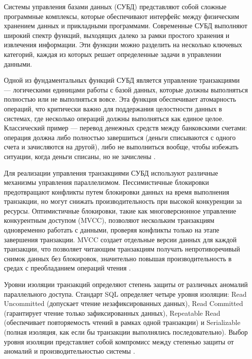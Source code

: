 \documentclass{SibFU-docs}
\begin{document}
Системы управления базами данных (СУБД) представляют собой сложные программные комплексы, которые обеспечивают интерфейс между физическим хранением данных и прикладными программами. Современные СУБД выполняют широкий спектр функций, выходящих далеко за рамки простого хранения и извлечения информации. Эти функции можно разделить на несколько ключевых категорий, каждая из которых решает определенные задачи в управлении данными.


Одной из фундаментальных функций СУБД является управление транзакциями — логическими единицами работы с базой данных, которые должны выполняться полностью или не выполняться вовсе. Эта функция обеспечивает атомарность операций, что критически важно для поддержания целостности данных в системах, где несколько операций должны выполняться как единое целое. Классический пример — перевод денежных средств между банковскими счетами: операция должна либо полностью завершиться (деньги списываются с одного счета и зачисляются на другой), либо не выполниться вообще, чтобы избежать ситуации, когда деньги списаны, но не зачислены \cite{gray1993}.

Для реализации управления транзакциями СУБД используют различные механизмы управления параллелизмом. Пессимистичные блокировки предотвращают конфликты путем блокировки данных на время выполнения транзакции, но могут снижать производительность при высокой конкуренции за ресурсы. Оптимистичные блокировки, такие как многоверсионное управление конкурентным доступом (MVCC), позволяют нескольким транзакциям одновременно работать с данными, проверяя конфликты только на этапе завершения транзакции. MVCC создает отдельные версии данных для каждой транзакции, что позволяет читающим транзакциям получать непротиворечивый снимок данных без блокировок, значительно повышая производительность в средах с преобладанием операций чтения \cite{gray1993}.

Уровни изоляции транзакций определяют степень защиты от различных аномалий параллельного доступа. Стандарт SQL определяет четыре уровня изоляции: Read Uncommitted (допускает чтение незафиксированных данных), Read Committed (гарантирует чтение только зафиксированных данных), Repeatable Read (обеспечивает повторяемость чтений в рамках одной транзакции) и Serializable (полная изоляция, как если бы транзакции выполнялись последовательно). Выбор уровня изоляции представляет собой компромисс между степенью защиты от аномалий и производительностью системы \cite{haerder1983}.
\end{document}

